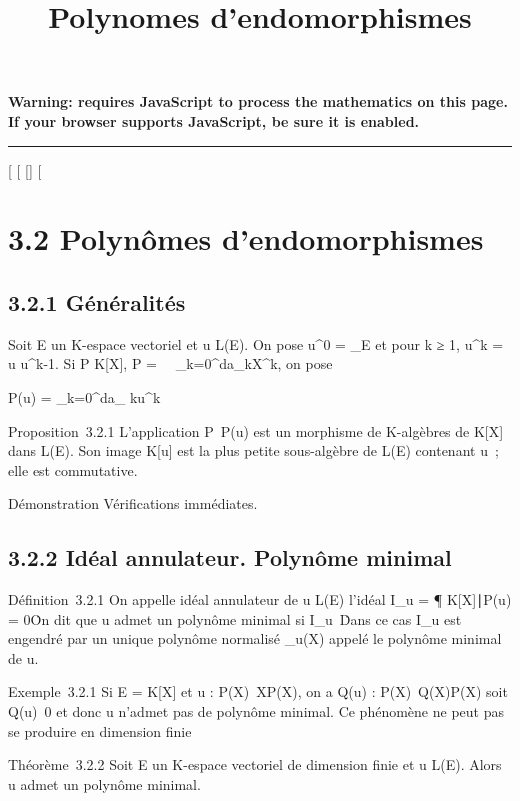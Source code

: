 \documentclass[]{article}
\title{Polynomes d'endomorphismes}
\author{}
\date{}
\begin{document}
\maketitle

\textbf{Warning: 
requires JavaScript to process the mathematics on this page.\\ If your
browser supports JavaScript, be sure it is enabled.}

\begin{center}\rule{3in}{0.4pt}\end{center}

[
[
[]
[

\section{3.2 Polynômes d'endomorphismes}

\subsection{3.2.1 Généralités}

Soit E un K-espace vectoriel et u \in L(E). On pose u^0 =
\mathrmId_E et pour k ≥ 1, u^k = u
\cdot u^k-1. Si P \in K[X], P =\
\sum ~
_k=0^da_kX^k, on pose

P(u) = \sum _k=0^da_
ku^k

Proposition~3.2.1 L'application P\mapsto~P(u) est un
morphisme de K-algèbres de K[X] dans L(E). Son image K[u] est la
plus petite sous-algèbre de L(E) contenant u~; elle est commutative.

Démonstration Vérifications immédiates.

\subsection{3.2.2 Idéal annulateur. Polynôme minimal}

Définition~3.2.1 On appelle idéal annulateur de u \in L(E) l'idéal
I_u = \P \in
K[X]∣P(u) = 0\. On dit
que u admet un polynôme minimal si
I_u\neq~\0\.
Dans ce cas I_u est engendré par un unique polynôme normalisé
\mu_u(X) appelé le polynôme minimal de u.

Exemple~3.2.1 Si E = K[X] et u :
P(X)\mapsto~XP(X), on a Q(u) :
P(X)\mapsto~Q(X)P(X) soit
Q(u)\neq~0 et donc u n'admet pas de polynôme
minimal. Ce phénomène ne peut pas se produire en dimension finie

Théorème~3.2.2 Soit E un K-espace vectoriel de dimension finie et u \in
L(E). Alors u admet un polynôme minimal.
\end{document}
